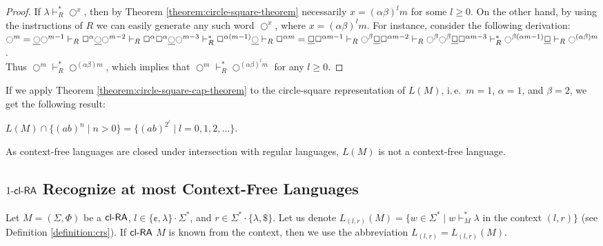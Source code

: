 \begin{proof}
If $\lambda \vdash_R^* \Circle^{x}$, then by Theorem \ref{theorem:circle-square-theorem} necessarily $x = (\alpha \beta)^l m$ for some $l \ge 0$. On the other hand, by using the instructions of $R$ we can easily generate any such word $\Circle^{x}$, where $x = (\alpha \beta)^l m$. For instance, consider the following derivation:\\
$\Circle^m = \underline{\Circle} \Circle^{m-1} \vdash_R \Square^{\alpha} \underline{\Circle} \Circle^{m-2} \vdash_R
\Square^{\alpha} \Square^{\alpha} \underline{\Circle} \Circle^{m-3} \vdash_R^*
\Square^{\alpha  (m-1)} \underline{\Circle} \vdash_R \Square^{\alpha  m} = \\
\underline{\Square} \Square^{\alpha  m - 1} \vdash_R
\Circle^{\beta} \underline{\Square} \Square^{\alpha  m - 2} \vdash_R
\Circle^{\beta} \Circle^{\beta} \underline{\Square} \Square^{\alpha  m - 3} \vdash_R^*
\Circle^{\beta (\alpha  m - 1)} \underline{\Square} \vdash_R \Circle^{(\alpha \beta)  m}$.\\
Thus $\Circle^m \vdash_R^* \Circle^{(\alpha \beta)  m}$, which implies that $\Circle^m \vdash_R^* \Circle^{(\alpha \beta)^l  m}$ for any $l \ge 0$.
\end{proof}

If we apply Theorem \ref{theorem:circle-square-cap-theorem} to the circle-square representation of $L(M)$, i.\,e.\ $m = 1$, $\alpha = 1$, and $\beta = 2$, we get the following result:

\begin{theorem}\label{theorem:4clRA}
$L(M) \cap \{(ab)^n \mid n > 0\} = \{(ab)^{2^l} \mid l = 0, 1, 2, \ldots\}$.
\end{theorem}

As context-free languages are closed under intersection with regular languages, $L(M)$ is not a context-free language.

\subsection{$\kclRA[1]$ Recognize at most Context-Free Languages}\label{1clRA}

Let $M = (\Sigma, \Phi)$ be a $\clRA$, $l \in \{ \cent, \lambda \} \cdot \Sigma^*$, and $r \in \Sigma^* \cdot \{ \lambda, \$ \}$. Let us denote $L_{(l,r)}(M) = \{w \in \Sigma^* \mid w \vdash_M^* \lambda$ in the context $(l,r) \}$ (see Definition \ref{definition:crs}). If $\clRA$ $M$ is known from the context, then we use the abbreviation $L_{(l,r)} = L_{(l,r)}(M)$.

